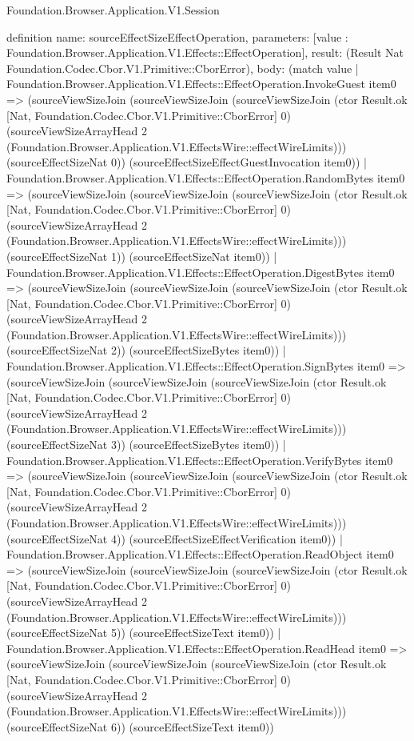 \begin{lexlean}{Foundation.Browser.Application.V1.Session}
\begin{semanticmodule}
definition{
  name: sourceEffectSizeEffectOperation,
  parameters: [value : Foundation.Browser.Application.V1.Effects::EffectOperation],
  result: (Result Nat Foundation.Codec.Cbor.V1.Primitive::CborError),
  body: (match value
    | Foundation.Browser.Application.V1.Effects::EffectOperation.InvokeGuest item0 => (sourceViewSizeJoin (sourceViewSizeJoin (sourceViewSizeJoin (ctor Result.ok [Nat, Foundation.Codec.Cbor.V1.Primitive::CborError] 0) (sourceViewSizeArrayHead 2 (Foundation.Browser.Application.V1.EffectsWire::effectWireLimits))) (sourceEffectSizeNat 0)) (sourceEffectSizeEffectGuestInvocation item0))
    | Foundation.Browser.Application.V1.Effects::EffectOperation.RandomBytes item0 => (sourceViewSizeJoin (sourceViewSizeJoin (sourceViewSizeJoin (ctor Result.ok [Nat, Foundation.Codec.Cbor.V1.Primitive::CborError] 0) (sourceViewSizeArrayHead 2 (Foundation.Browser.Application.V1.EffectsWire::effectWireLimits))) (sourceEffectSizeNat 1)) (sourceEffectSizeNat item0))
    | Foundation.Browser.Application.V1.Effects::EffectOperation.DigestBytes item0 => (sourceViewSizeJoin (sourceViewSizeJoin (sourceViewSizeJoin (ctor Result.ok [Nat, Foundation.Codec.Cbor.V1.Primitive::CborError] 0) (sourceViewSizeArrayHead 2 (Foundation.Browser.Application.V1.EffectsWire::effectWireLimits))) (sourceEffectSizeNat 2)) (sourceEffectSizeBytes item0))
    | Foundation.Browser.Application.V1.Effects::EffectOperation.SignBytes item0 => (sourceViewSizeJoin (sourceViewSizeJoin (sourceViewSizeJoin (ctor Result.ok [Nat, Foundation.Codec.Cbor.V1.Primitive::CborError] 0) (sourceViewSizeArrayHead 2 (Foundation.Browser.Application.V1.EffectsWire::effectWireLimits))) (sourceEffectSizeNat 3)) (sourceEffectSizeBytes item0))
    | Foundation.Browser.Application.V1.Effects::EffectOperation.VerifyBytes item0 => (sourceViewSizeJoin (sourceViewSizeJoin (sourceViewSizeJoin (ctor Result.ok [Nat, Foundation.Codec.Cbor.V1.Primitive::CborError] 0) (sourceViewSizeArrayHead 2 (Foundation.Browser.Application.V1.EffectsWire::effectWireLimits))) (sourceEffectSizeNat 4)) (sourceEffectSizeEffectVerification item0))
    | Foundation.Browser.Application.V1.Effects::EffectOperation.ReadObject item0 => (sourceViewSizeJoin (sourceViewSizeJoin (sourceViewSizeJoin (ctor Result.ok [Nat, Foundation.Codec.Cbor.V1.Primitive::CborError] 0) (sourceViewSizeArrayHead 2 (Foundation.Browser.Application.V1.EffectsWire::effectWireLimits))) (sourceEffectSizeNat 5)) (sourceEffectSizeText item0))
    | Foundation.Browser.Application.V1.Effects::EffectOperation.ReadHead item0 => (sourceViewSizeJoin (sourceViewSizeJoin (sourceViewSizeJoin (ctor Result.ok [Nat, Foundation.Codec.Cbor.V1.Primitive::CborError] 0) (sourceViewSizeArrayHead 2 (Foundation.Browser.Application.V1.EffectsWire::effectWireLimits))) (sourceEffectSizeNat 6)) (sourceEffectSizeText item0))
}
\end{semanticmodule}
\end{lexlean}
